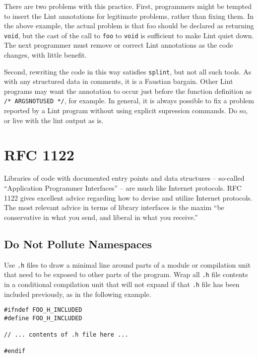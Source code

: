 \documentclass{lulu}
\newcommand{\code}[1]{\texttt{#1}\xspace}
\newcommand{\heading}[1]{\markboth{\textup{\thechapter\ -- #1}}{}}
\begin{document}
There are two problems with this practice.  First, programmers might
be tempted to insert the Lint annotations for legitimate problems,
rather than fixing them.  In the above example, the actual problem is
that foo should be declared as returning \code{void}, but the cast of
the call to \code{foo} to \code{void} is sufficient to make Lint quiet
down.  The next programmer must remove or correct Lint annotations as
the code changes, with little benefit.

Second, rewriting the code in this way satisfies \code{splint}, but
not all such tools.  As with any structured data in comments, it is a
Faustian bargain.  Other Lint programs may want the annotation to
occur just before the function definition as \code{/*~ARGSNOTUSED~*/},
for example.  In general, it is always possible to fix a problem
reported by a Lint program without using explicit supression commands.
Do so, or live with the lint output as is.

\chapter{RFC 1122}
\heading{RFC 1122}

Libraries of code with documented entry points and data structures --
so-called ``Application Programmer Interfaces'' -- are much like
Internet protocols.  RFC 1122 gives excellent advice regarding how to
devise and utilize Internet protocols.  The most relevant advice in
terms of library interfaces is the maxim ``be conservative in what you
send, and liberal in what you receive.''

\section{Do Not Pollute Namespaces}

Use \code{.h} files to draw a minimal line around parts of a module or
compilation unit that need to be exposed to other parts of the
program.  Wrap all \code{.h} file contents in a conditional
compilation unit that will not expand if that \code{.h} file has been
included previously, as in the following example.

\begin{samepage}
\begin{verbatim}
#ifndef FOO_H_INCLUDED
#define FOO_H_INCLUDED

// ... contents of .h file here ...

#endif
\end{verbatim}
\end{samepage}
\end{document}
